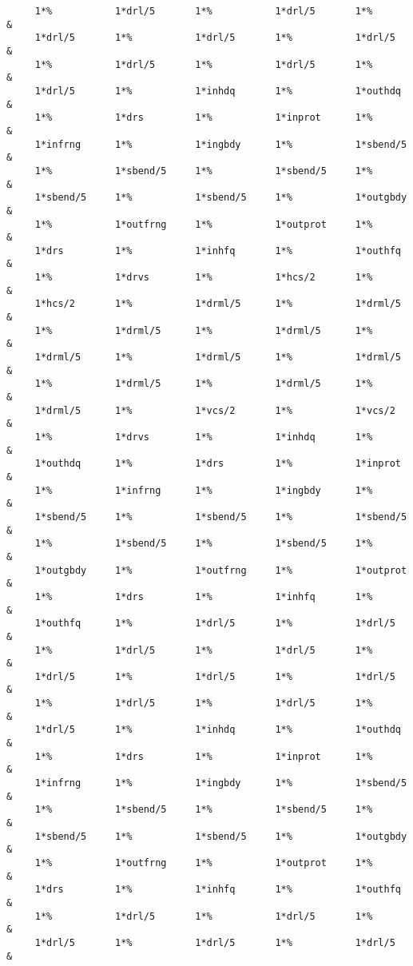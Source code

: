 \begin{footnotesize}
\begin{verbatim}
     1*%           1*drl/5       1*%           1*drl/5       1*%        &
     1*drl/5       1*%           1*drl/5       1*%           1*drl/5    &
     1*%           1*drl/5       1*%           1*drl/5       1*%        &
     1*drl/5       1*%           1*inhdq       1*%           1*outhdq   &
     1*%           1*drs         1*%           1*inprot      1*%        &
     1*infrng      1*%           1*ingbdy      1*%           1*sbend/5  &
     1*%           1*sbend/5     1*%           1*sbend/5     1*%        &
     1*sbend/5     1*%           1*sbend/5     1*%           1*outgbdy  &
     1*%           1*outfrng     1*%           1*outprot     1*%        &
     1*drs         1*%           1*inhfq       1*%           1*outhfq   &
     1*%           1*drvs        1*%           1*hcs/2       1*%        &
     1*hcs/2       1*%           1*drml/5      1*%           1*drml/5   &
     1*%           1*drml/5      1*%           1*drml/5      1*%        &
     1*drml/5      1*%           1*drml/5      1*%           1*drml/5   &
     1*%           1*drml/5      1*%           1*drml/5      1*%        &
     1*drml/5      1*%           1*vcs/2       1*%           1*vcs/2    &
     1*%           1*drvs        1*%           1*inhdq       1*%        &
     1*outhdq      1*%           1*drs         1*%           1*inprot   &
     1*%           1*infrng      1*%           1*ingbdy      1*%        &
     1*sbend/5     1*%           1*sbend/5     1*%           1*sbend/5  &
     1*%           1*sbend/5     1*%           1*sbend/5     1*%        &
     1*outgbdy     1*%           1*outfrng     1*%           1*outprot  &
     1*%           1*drs         1*%           1*inhfq       1*%        &
     1*outhfq      1*%           1*drl/5       1*%           1*drl/5    &
     1*%           1*drl/5       1*%           1*drl/5       1*%        &
     1*drl/5       1*%           1*drl/5       1*%           1*drl/5    &
     1*%           1*drl/5       1*%           1*drl/5       1*%        &
     1*drl/5       1*%           1*inhdq       1*%           1*outhdq   &
     1*%           1*drs         1*%           1*inprot      1*%        &
     1*infrng      1*%           1*ingbdy      1*%           1*sbend/5  &
     1*%           1*sbend/5     1*%           1*sbend/5     1*%        &
     1*sbend/5     1*%           1*sbend/5     1*%           1*outgbdy  &
     1*%           1*outfrng     1*%           1*outprot     1*%        &
     1*drs         1*%           1*inhfq       1*%           1*outhfq   &
     1*%           1*drl/5       1*%           1*drl/5       1*%        &
     1*drl/5       1*%           1*drl/5       1*%           1*drl/5    &

\end{verbatim}
\end{footnotesize}
